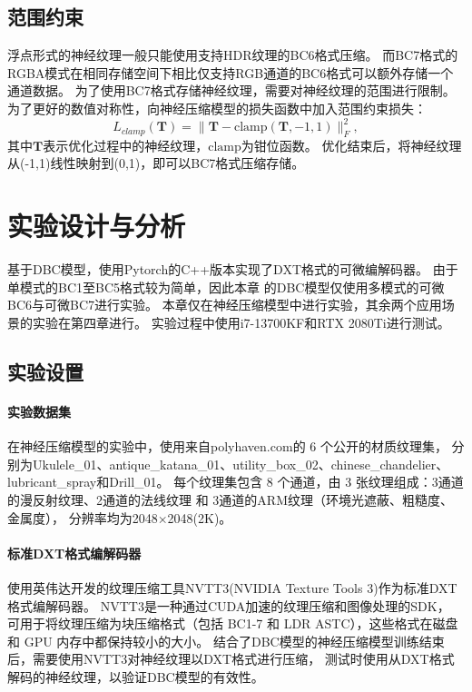 \subsection{范围约束}
\label{范围约束}

浮点形式的神经纹理一般只能使用支持HDR纹理的BC6格式压缩。
而BC7格式的RGBA模式在相同存储空间下相比仅支持RGB通道的BC6格式可以额外存储一个通道数据。
为了使用BC7格式存储神经纹理，需要对神经纹理的范围进行限制。
为了更好的数值对称性，向神经压缩模型的损失函数中加入范围约束损失：
\begin{equation}
L_{clamp}(\mathbf{T})=\|\mathbf{T}-\text{clamp}(\mathbf{T},-1,1)\|_F^2,
\end{equation}
其中$\mathbf{T}$表示优化过程中的神经纹理，$\text{clamp}$为钳位函数。
优化结束后，将神经纹理从(-1,1)线性映射到(0,1)，即可以BC7格式压缩存储。


\section{实验设计与分析}

基于DBC模型，使用Pytorch的C++版本实现了DXT格式的可微编解码器。
由于单模式的BC1至BC5格式较为简单，因此本章
的DBC模型仅使用多模式的可微BC6与可微BC7进行实验。
本章仅在神经压缩模型中进行实验，其余两个应用场景的实验在第四章进行。
实验过程中使用i7-13700KF和RTX 2080Ti进行测试。

\subsection{实验设置}

\paragraph{实验数据集}

在神经压缩模型的实验中，使用来自polyhaven.com\cite{PolyHaven}的 6 个公开的材质纹理集，
分别为Ukulele\_01、antique\_katana\_01、utility\_box\_02、chinese\_chandelier、
lubricant\_spray和Drill\_01。
每个纹理集包含 8 个通道，由 3 张纹理组成：3通道的漫反射纹理、2通道的法线纹理 和 3通道的ARM纹理（环境光遮蔽、粗糙度、金属度），
分辨率均为2048×2048(2K)。

\paragraph{标准DXT格式编解码器}

使用英伟达开发的纹理压缩工具NVTT3\cite{NVTT3}(NVIDIA Texture Tools 3)作为标准DXT格式编解码器。
NVTT3是一种通过CUDA加速的纹理压缩和图像处理的SDK，
可用于将纹理压缩为块压缩格式（包括 BC1-7 和 LDR ASTC），这些格式在磁盘和 GPU 内存中都保持较小的大小。
结合了DBC模型的神经压缩模型训练结束后，需要使用NVTT3对神经纹理以DXT格式进行压缩，
测试时使用从DXT格式解码的神经纹理，以验证DBC模型的有效性。

